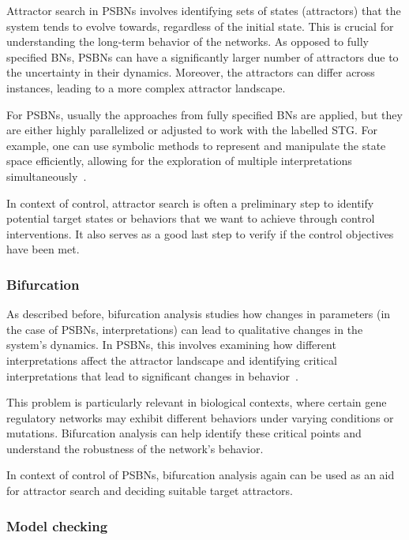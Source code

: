Attractor search in PSBNs involves identifying sets of states (attractors) that the system tends to evolve towards, regardless of the initial state. This is crucial for understanding the long-term behavior of the networks. As opposed to fully specified BNs, PSBNs can have a significantly larger number of attractors due to the uncertainty in their dynamics. Moreover, the attractors can differ across instances, leading to a more complex attractor landscape.

For PSBNs, usually the approaches from fully specified BNs are applied, but they are either highly parallelized or adjusted to work with the labelled STG. For example, one can use symbolic methods to represent and manipulate the state space efficiently, allowing for the exploration of multiple interpretations simultaneously~\cite{benevs2022bdd,Pauleve2023b}.

In context of control, attractor search is often a preliminary step to identify potential target states or behaviors that we want to achieve through control interventions. It also serves as a good last step to verify if the control objectives have been met.

\subsubsection{Bifurcation}

As described before, bifurcation analysis studies how changes in parameters (in the case of PSBNs, interpretations) can lead to qualitative changes in the system's dynamics. In PSBNs, this involves examining how different interpretations affect the attractor landscape and identifying critical interpretations that lead to significant changes in behavior~\cite{Benes2022, Pastva2022}.

This problem is particularly relevant in biological contexts, where certain gene regulatory networks may exhibit different behaviors under varying conditions or mutations. Bifurcation analysis can help identify these critical points and understand the robustness of the network's behavior.

In context of control of PSBNs, bifurcation analysis again can be used as an aid for attractor search and deciding suitable target attractors. 

\subsubsection{Model checking}

